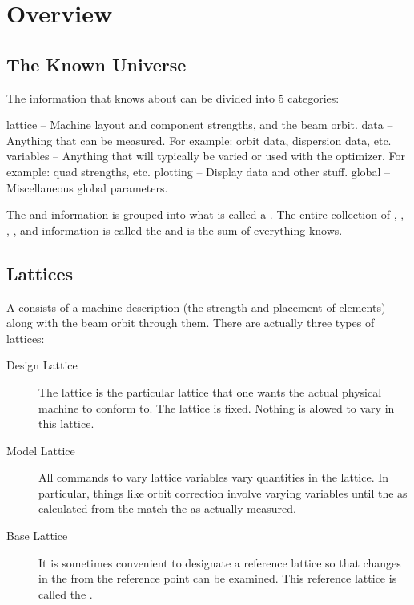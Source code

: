 \chapter{Overview}
\label{c:overview}

\section{The Known Universe}

The information that \tao knows about can be divided into 5 categories: 
\begin{example}
  lattice   -- Machine layout and component strengths, and the beam orbit.
  data      -- Anything that can be measured. 
               For example: orbit data, dispersion data, etc.
  variables -- Anything that will typically be varied or used with the optimizer. 
               For example: quad strengths, etc.
  plotting  -- Display data and other stuff.
  global    -- Miscellaneous global parameters.
\end{example}
The  and  information is grouped into what is called a
. The entire collection of , ,
, , and  information is called
the  and is the sum of everything \tao knows.

\section{Lattices}

A  consists of a machine description (the strength and
placement of elements) along with the beam orbit through them. There
are actually three types of lattices:
  \vspace*{-3ex}
  \begin{description}
  \item[Design Lattice] \Newline 
The  lattice is the particular lattice that one wants the
actual physical machine to conform to. The  lattice is
fixed. Nothing is alowed to vary in this lattice.
  \item[Model Lattice] \Newline
All \tao commands to vary lattice variables vary quantities in the
 lattice. In particular, things like orbit correction
involve varying  variables until the  as calculated
from the  match the  as actually measured.
  \item[Base Lattice] \Newline
It is sometimes convenient to designate a reference lattice so that
changes in the  from the reference point can be examined.
This reference lattice is called the .
  \end{description}


